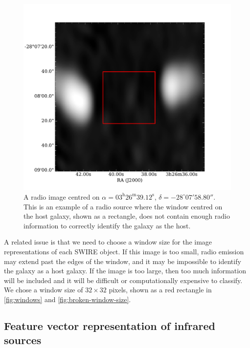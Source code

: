 \documentclass[fleqn,usenatbib,usedcolumn]{mnras}
\newcommand{\text}{\mathrm}
\begin{document}
    \begin{figure}
      \centering
      \includegraphics[width=\linewidth]{images/ARG0003sky_radio}
      \caption{A radio image centred on $\alpha =
        03^\text{h}26^\text{m}39.12^\text{s}$, $\delta = -28^\circ{}07'58.80''$.        %
        This is an example of a radio source where the window centred on the
        host galaxy, shown as a rectangle, does not contain enough radio
        information to correctly identify the galaxy as the host.}
      \label{fig:broken-window-size}
    \end{figure}

    A related issue is that we need to choose a window size for the image
    representations of each SWIRE object. If this image is too small, radio
    emission may extend past the edges of the window, and it may be impossible
    to identify the galaxy as a host galaxy. If the image is too large, then
    too much information will be included and it will be difficult or
    computationally expensive to classify. We chose a window size of $32
    \times 32$ pixels, shown as a red rectangle in
    \autoref{fig:windows} and \autoref{fig:broken-window-size}.

  \subsection{Feature vector representation of infrared sources}
  \label{vector-representation-of-infrared-sources}
\end{document}
